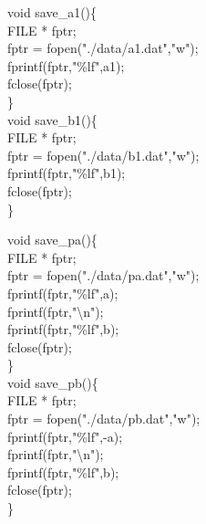\documentclass{beamer}
\theoremstyle{remark}
\numberwithin{equation}{section}
\begin{document}
\begin{frame}[t]
\vspace{20pt}
void save\_a1()\{\\
    FILE * fptr;\\
    fptr = fopen("./data/a1.dat","w");\\
    fprintf(fptr,"\%lf",a1);\\
    fclose(fptr);\\
\}\\
\vspace{20pt}
void save\_b1()\{\\
    FILE * fptr;\\
    fptr = fopen("./data/b1.dat","w");\\
    fprintf(fptr,"\%lf",b1);\\
    fclose(fptr);\\
\}\\
\vspace{20pt}


\end{frame}
\begin{frame}
\vspace{20pt}
void save\_pa()\{\\
    FILE * fptr;\\
    fptr = fopen("./data/pa.dat","w");\\
    fprintf(fptr,"\%lf",a);\\
    fprintf(fptr,"\textbackslash n");\\
    fprintf(fptr,"\%lf",b);\\
    fclose(fptr);\\
\}\\
\vspace{12pt}
void save\_pb()\{\\
    FILE * fptr;\\
    fptr = fopen("./data/pb.dat","w");\\
    fprintf(fptr,"\%lf",-a);\\
    fprintf(fptr,"\textbackslash n");\\
    fprintf(fptr,"\%lf",b);\\
    fclose(fptr);\\
\}\\
\vspace{12pt}

\end{frame}
\end{document}
